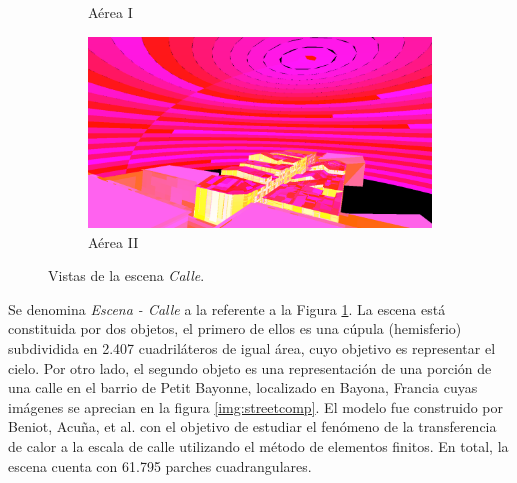 \begin{figure}[htbp]
\begin{subfigure}{0.45\textwidth}
		\caption{Aérea I}
	\end{subfigure}
	\begin{subfigure}{0.45\textwidth}
		\includegraphics[width=1\linewidth]{assets/street4}
		\caption{Aérea II}
	\end{subfigure}
	\caption{Vistas de la escena \textit{Calle}.}
	\label{img:street}
\end{figure}

Se denomina \textit{Escena - Calle} a la referente a la Figura \ref{img:street}. La escena está constituida por dos objetos, el primero de ellos es una cúpula (hemisferio) subdividida en 2.407 cuadriláteros de igual área, cuyo objetivo es representar el cielo. Por otro lado, el segundo objeto es una representación de una porción de una calle en el barrio de Petit Bayonne, localizado en Bayona, Francia cuyas imágenes se aprecian en la figura \ref{img:streetcomp}. El modelo fue construido por Beniot, Acuña, et al. \cite{Benoit} con el objetivo de estudiar el fenómeno de la transferencia de calor a la escala de calle utilizando el método de elementos finitos. En total, la escena cuenta con 61.795 parches cuadrangulares.


